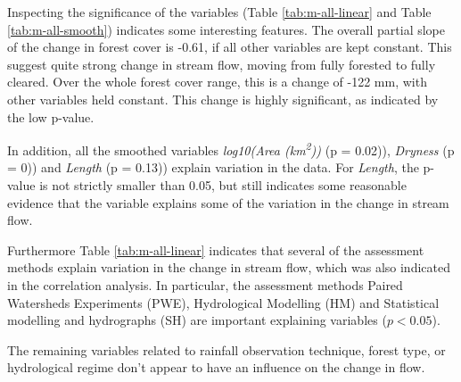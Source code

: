 \documentclass[]{elsarticle} %
\begin{document}
Inspecting the significance of the variables (Table \ref{tab:m-all-linear} and Table \ref{tab:m-all-smooth}) indicates some interesting features. The overall partial slope of the change in forest cover is -0.61, if all other variables are kept constant. This suggest quite strong change in stream flow, moving from fully forested to fully cleared. Over the whole forest cover range, this is a change of -122 mm, with other variables held constant. This change is highly significant, as indicated by the low p-value.

In addition, all the smoothed variables \emph{log10(Area (km\textsuperscript{2}))} (p = 0.02)), \emph{Dryness} (p = 0)) and \emph{Length} (p = 0.13)) explain variation in the data. For \emph{Length}, the p-value is not strictly smaller than 0.05, but still indicates some reasonable evidence that the variable explains some of the variation in the change in stream flow.

Furthermore Table \ref{tab:m-all-linear} indicates that several of the assessment methods explain variation in the change in stream flow, which was also indicated in the correlation analysis. In particular, the assessment methods Paired Watersheds Experiments (PWE), Hydrological Modelling (HM) and Statistical modelling and hydrographs (SH) are important explaining variables (\(p < 0.05\)).

The remaining variables related to rainfall observation technique, forest type, or hydrological regime don't appear to have an influence on the change in flow.
\end{document}
